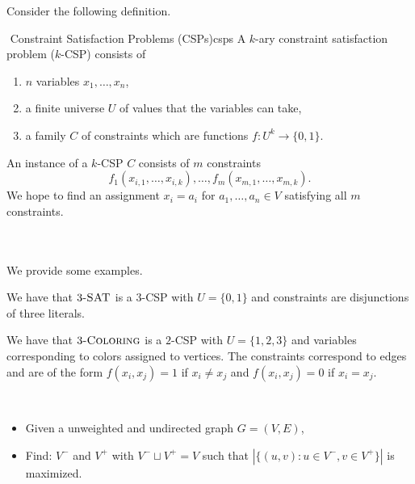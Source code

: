         Consider the following definition.
        \begin{definition}{\Stop\,\,Constraint Satisfaction Problems (CSPs)}{csps}
            A \(k\)-ary constraint satisfaction problem (\(k\)-CSP) consists of
            \begin{enumerate}
                \item \(n\) variables \(x_1,\ldots,x_n\),
                \item a finite universe \(U\) of values that the variables can take,
                \item a family \(C\) of constraints which are functions \(f:U^k\to\{0,1\}\).
            \end{enumerate}
            An instance of a \(k\)-CSP \(C\) consists of \(m\) constraints
            \begin{equation*}
                f_1(x_{i,1},\ldots, x_{i,k}),\ldots, f_m(x_{m,1},\ldots, x_{m,k}).
            \end{equation*}
            We hope to find an assignment \(x_i=a_i\) for \(a_1,\ldots,a_n\in V\) satisfying all \(m\) constraints.
        \end{definition}
        \vphantom
        \\
        \\
        We provide some examples.
        \begin{example}
            We have that \(3\textsc{-SAT}\) is a \(3\)-CSP with \(U=\{0,1\}\) and constraints are disjunctions of three literals.
        \end{example}
        \begin{example}
            We have that \(3\textsc{-Coloring}\) is a \(2\)-CSP with \(U=\{1,2,3\}\) and variables corresponding to colors assigned to vertices. The constraints correspond to edges and are of the form \(f(x_i,x_j)=1\) if \(x_i\neq x_j\) and \(f(x_i,x_j)=0\) if \(x_i=x_j\).
        \end{example}
        \begin{compprob} \label{prob:maxcut}
            \vphantom
            \\
            \begin{itemize}
                \item Given a unweighted and undirected graph \(G=(V,E)\),
                \item Find: \(V^-\) and \(V^+\) with \(V^-\sqcup V^+=V\) such that \(|\{(u,v): u\in V^-,v\in V^+\}|\) is maximized.
            \end{itemize}
        \end{compprob}
